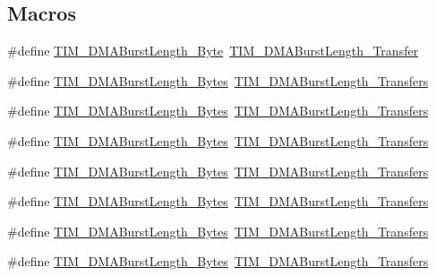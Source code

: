 \subsection*{Macros}
\begin{DoxyCompactItemize}
\item 
\#define \hyperlink{group___t_i_m___legacy_gad915c67fae262b887f4f074809448309}{T\+I\+M\+\_\+\+D\+M\+A\+Burst\+Length\+\_\+Byte}~\hyperlink{group___t_i_m___d_m_a___burst___length_gab87f91f1c5583b9888cb6bb37fc639e2}{T\+I\+M\+\_\+\+D\+M\+A\+Burst\+Length\+\_\+Transfer}
\item 
\#define \hyperlink{group___t_i_m___legacy_gabed2d89b663148923f4a7ca63d62d947}{T\+I\+M\+\_\+\+D\+M\+A\+Burst\+Length\+\_\+Bytes}~\hyperlink{group___t_i_m___d_m_a___burst___length_ga829504c3e8c90a9445f6a223bc3034f8}{T\+I\+M\+\_\+\+D\+M\+A\+Burst\+Length\+\_\+Transfers}
\item 
\#define \hyperlink{group___t_i_m___legacy_gad06dbc68a994da99b017a18a7197c0ad}{T\+I\+M\+\_\+\+D\+M\+A\+Burst\+Length\+\_\+Bytes}~\hyperlink{group___t_i_m___d_m_a___burst___length_ga3a99863a0925e0cc9a11b91aade66f11}{T\+I\+M\+\_\+\+D\+M\+A\+Burst\+Length\+\_\+Transfers}
\item 
\#define \hyperlink{group___t_i_m___legacy_ga620ce560a1d7a6d6769cacd2a2ead48d}{T\+I\+M\+\_\+\+D\+M\+A\+Burst\+Length\+\_\+Bytes}~\hyperlink{group___t_i_m___d_m_a___burst___length_ga84bfeb309593a1ac580e233bf7514b36}{T\+I\+M\+\_\+\+D\+M\+A\+Burst\+Length\+\_\+Transfers}
\item 
\#define \hyperlink{group___t_i_m___legacy_gaf9ac4a4cfd3dcfb7ba859898e702c881}{T\+I\+M\+\_\+\+D\+M\+A\+Burst\+Length\+\_\+Bytes}~\hyperlink{group___t_i_m___d_m_a___burst___length_ga44f8aa51fbe8887a5f3c37a0e776902c}{T\+I\+M\+\_\+\+D\+M\+A\+Burst\+Length\+\_\+Transfers}
\item 
\#define \hyperlink{group___t_i_m___legacy_ga7a9cc659b4fc010a31815254f6b57e3f}{T\+I\+M\+\_\+\+D\+M\+A\+Burst\+Length\+\_\+Bytes}~\hyperlink{group___t_i_m___d_m_a___burst___length_ga8be40a21654eea72e9c1bf9922675b22}{T\+I\+M\+\_\+\+D\+M\+A\+Burst\+Length\+\_\+Transfers}
\item 
\#define \hyperlink{group___t_i_m___legacy_ga5833cc5442c40a97a6a90bcd34a2e773}{T\+I\+M\+\_\+\+D\+M\+A\+Burst\+Length\+\_\+Bytes}~\hyperlink{group___t_i_m___d_m_a___burst___length_gaf2ae83bd73b0e92b73e5ebfc11f9bfad}{T\+I\+M\+\_\+\+D\+M\+A\+Burst\+Length\+\_\+Transfers}
\item 
\#define \hyperlink{group___t_i_m___legacy_gab7c002a9f06f7c238e15a0c61f047062}{T\+I\+M\+\_\+\+D\+M\+A\+Burst\+Length\+\_\+Bytes}~\hyperlink{group___t_i_m___d_m_a___burst___length_ga8a760d7114425596736b0ecdbe5fdea6}{T\+I\+M\+\_\+\+D\+M\+A\+Burst\+Length\+\_\+Transfers}

\end{DoxyCompactItemize}
